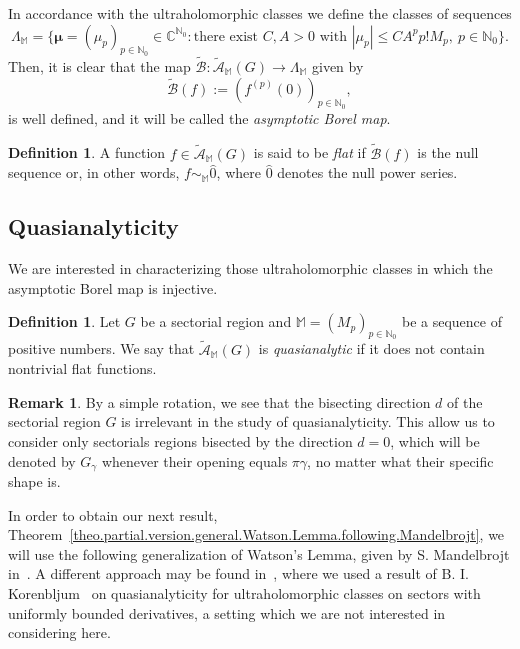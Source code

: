 \documentclass[11pt,a4paper]{article}
\theoremstyle{definition}
\newtheorem{defi}[theo]{Definition}
\newtheorem{rema}[theo]{Remark}
\def\ga{\gamma}
\def\bmu{\boldsymbol{\mu}}%
\def\N{\mathbb{N}}
\def\C{\mathbb{C}}      %
\def\M{\mathbb{M}}
\begin{document}
In accordance with the ultraholomorphic classes we define the classes of sequences
$$\Lambda_{\M}=\Big\{\bmu=(\mu_{p})_{p\in\N_{0}}\in\C^{\N_{0}}: \textrm{there exist $C,A>0$ with }|\mu_p|\le CA^{p}p!M_{p},\ p\in\N_{0}\Big\}.$$
Then, it is clear that the map $\tilde{\mathcal{B}}:\tilde{\mathcal{A}}_{\M}(G)\longrightarrow \Lambda_{\M}$ given by
\begin{equation*}%
\tilde{\mathcal{B}}(f):=(f^{(p)}(0))_{p\in\N_{0}},
\end{equation*}
is well defined, and it will be called the \textit{asymptotic Borel map}.


\begin{defi}
A function $f\in\tilde{\mathcal{A}}_{\M}(G)$ is said to be \textit{flat} if $\tilde{\mathcal{B}}(f)$ is the null sequence or, in other words, $f\sim_{\M}\hat{0}$, where $\hat{0}$ denotes the null power series.
\end{defi}





\subsection{Quasianalyticity}

We are interested in characterizing those ultraholomorphic classes in which the asymptotic Borel map is injective.

\begin{defi}
Let $G$ be a sectorial region and $\M=(M_{p})_{p\in\N_{0}}$ be a sequence of positive numbers. We say that $\mathcal{\tilde{A}}_{\M}(G)$
is  \textit{quasianalytic} if it does not contain nontrivial flat functions.
\end{defi}

\begin{rema} By a simple rotation, we see that the bisecting direction $d$ of the sectorial region $G$ is irrelevant in the study of
quasianalyticity. This allow us to consider only sectorials regions bisected by the direction $d=0$, which will be denoted by $G_\ga$ whenever their opening equals $\pi\ga$, no matter what their specific shape is.
\end{rema}

In order to obtain our next result, Theorem~\ref{theo.partial.version.general.Watson.Lemma.following.Mandelbrojt}, we will use the following generalization of Watson's Lemma, given
by S. Mandelbrojt in~\cite{mandelbrojt}. A different approach may be found in~\cite{SanzFlat}, where we used a result of B. I. Korenbljum~\cite{korenbljum} on quasianalyticity for ultraholomorphic classes on sectors with uniformly bounded derivatives, a setting which we are not interested in considering here.
\end{document}
